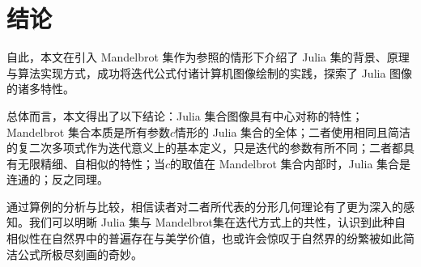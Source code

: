 \section{结论}
自此，本文在引入 Mandelbrot 集作为参照的情形下介绍了 Julia 集的背景、原理与算法实现方式，成功将迭代公式付诸计算机图像绘制的实践，探索了 Julia 图像的诸多特性。

总体而言，本文得出了以下结论：Julia 集合图像具有中心对称的特性；Mandelbrot 集合本质是所有参数$c$情形的 Julia 集合的全体；二者使用相同且简洁的复二次多项式作为迭代意义上的基本定义，只是迭代的参数有所不同；二者都具有无限精细、自相似的特性；当$c$的取值在 Mandelbrot 集合内部时，Julia 集合是连通的；反之同理。

通过算例的分析与比较，相信读者对二者所代表的分形几何理论有了更为深入的感知。我们可以明晰 Julia 集与 Mandelbrot集在迭代方式上的共性，认识到此种自相似性在自然界中的普遍存在与美学价值，也或许会惊叹于自然界的纷繁被如此简洁公式所极尽刻画的奇妙。
